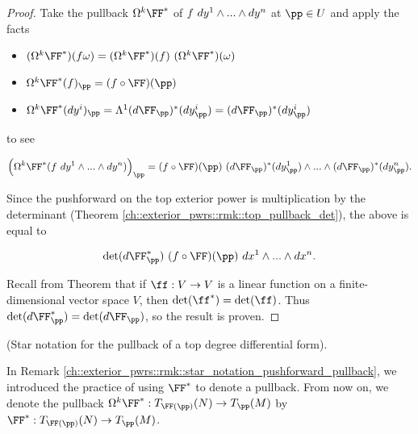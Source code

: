 \begin{proof}
   Take the pullback $\Omega^k \FF^*$ of $f \text{ } dy^1 \wedge ... \wedge dy^n$ at $\pp \in U$ and apply the facts

   \begin{itemize}
       \item ${(\Omega^k \FF^*)(f \omega) = (\Omega^k \FF^*)(f) \spc (\Omega^k \FF^*)(\omega)}$
       \item $\Omega^k \FF^*(f)_\pp = (f \circ \FF)(\pp)$
       \item $\Omega^k \FF^*(dy^i)_\pp = \Lambda^1(d\FF_\pp)^*(dy^i_\pp) = (d\FF_\pp)^*(dy^i_\pp)$
   \end{itemize}
   
   to see
    
   \begin{align*}
        \Big(\Omega^k \FF^*(f \spc dy^1 \wedge ... \wedge dy^n ) \Big)_\pp = (f \circ \FF)(\pp) \spc 
        (d\FF_\pp)^*(dy^1_\pp) \wedge ... \wedge (d\FF_\pp)^*(dy^n_\pp).
    \end{align*}
    
    Since the pushforward on the top exterior power is multiplication by the determinant (Theorem \ref{ch::exterior_pwrs::rmk::top_pullback_det}), the above is equal to
    
    \begin{align*}
         \det(d\FF_\pp^*) \spc (f \circ \FF)(\pp) \spc dx^1 \wedge ... \wedge dx^n.
    \end{align*}

    Recall from Theorem \label{ch::exterior_pwrs::rmk::det_dual_invariant} that if $\ff:V \rightarrow V$ is a linear function on a finite-dimensional vector space $V$, then $\det(\ff^*) = \det(\ff)$. Thus $\det(d\FF_\pp^*) =  \det(d\FF_\pp)$, so the result is proven.
\end{proof}

\begin{remark}
\label{ch::diff_forms::rmk::pullback_star_notation}
    (Star notation for the pullback of a top degree differential form).
    
    In Remark \ref{ch::exterior_pwrs::rmk::star_notation_pushforward_pullback}, we introduced the practice of using $\FF^*$ to denote a pullback. From now on, we denote the pullback $\Omega^k \FF^*:T_{\FF(\pp)}(N) \rightarrow T_\pp(M)$ by $\FF^*:T_{\FF(\pp)}(N) \rightarrow T_\pp(M)$.
\end{remark}

\newpage

